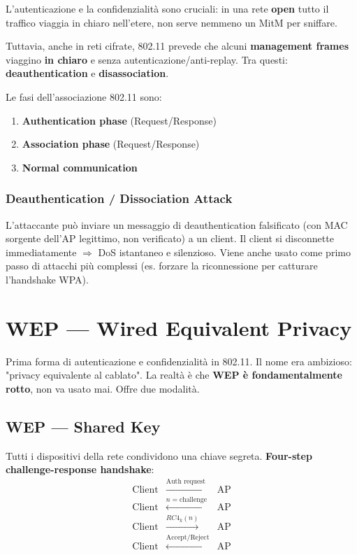 L'autenticazione e la confidenzialit\`a sono cruciali: in una rete \textbf{open} tutto il traffico viaggia in chiaro nell'etere, non serve nemmeno un MitM per sniffare.

Tuttavia, anche in reti cifrate, 802.11 prevede che alcuni \textbf{management frames} viaggino \textbf{in chiaro} e senza autenticazione/anti-replay. Tra questi: \textbf{deauthentication} e \textbf{disassociation}.

Le fasi dell'associazione 802.11 sono:
\begin{enumerate}
  \item \textbf{Authentication phase} (Request/Response)
  \item \textbf{Association phase} (Request/Response)
  \item \textbf{Normal communication}
\end{enumerate}

\subsubsection{Deauthentication / Dissociation Attack}

L'attaccante pu\`o inviare un messaggio di deauthentication falsificato (con MAC sorgente dell'AP legittimo, non verificato) a un client. Il client si disconnette immediatamente $\Rightarrow$ DoS istantaneo e silenzioso. Viene anche usato come primo passo di attacchi pi\`u complessi (es. forzare la riconnessione per catturare l'handshake WPA).


\section{WEP --- Wired Equivalent Privacy}

Prima forma di autenticazione e confidenzialit\`a in 802.11. Il nome era ambizioso: "privacy equivalente al cablato". La realt\`a \`e che \textbf{WEP \`e fondamentalmente rotto}, non va usato mai. Offre due modalit\`a.

\subsection{WEP --- Shared Key}

Tutti i dispositivi della rete condividono una chiave segreta. \textbf{Four-step challenge-response handshake}:
\[
  \begin{array}{rcl}
    \text{Client} & \xrightarrow{\text{Auth request}} & \text{AP} \\
    \text{Client} & \xleftarrow{n = \text{challenge}} & \text{AP} \\
    \text{Client} & \xrightarrow{RC4_{k}(n)} & \text{AP} \\
    \text{Client} & \xleftarrow{\text{Accept/Reject}} & \text{AP}
  \end{array}
\]

